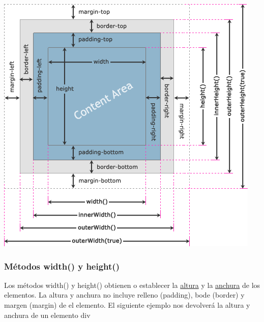 \documentclass[11pt]{article}
\begin{document}
\begin{center}
\includegraphics[width=.9\linewidth]{./img/dimensiones-jquery.png}
\end{center}



\subsubsection*{Métodos width() y height()}
\label{sec:org88fc940}

Los métodos width() y height() obtienen o establecer la \uline{altura} y la \uline{anchura} de los elementos. La altura y anchura no incluye relleno (padding), bode (border) y margen (margin) de el elemento. El siguiente ejemplo nos devolverá la altura y anchura de un elemento div
\end{document}
